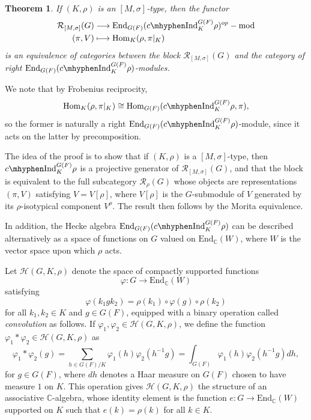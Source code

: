 \documentclass{article}
\newcommand{\Hom}{\mathrm{Hom}}
\newcommand{\End}{\mathrm{End}}
\newcommand{\cR}{\mathcal{R}}
\newcommand{\cH}{\mathcal{H}}
\newcommand{\CC}{\mathbb{C}}
\newcommand{\cInd}{c\mhyphen\mathrm{Ind}}
\theoremstyle{plain}
\newtheorem{theorem}{Theorem}[section]
\theoremstyle{definition}
\begin{document}
    \begin{theorem}
        If $(K,\rho)$ is an $[M,\sigma]$-type, then the functor 
        \begin{align*}
            \cR_{[M,\sigma]}(G)&\longrightarrow \End_{G(F)}(\cInd_K^{G(F)}\rho)^{op}-\textrm{mod}\\
            (\pi,V)&\longmapsto\Hom_K(\rho,\pi|_K)
        \end{align*}
        is an equivalence of categories between the block $\cR_{[M,\sigma]}(G)$ and the category of right $\End_{G(F)}(\cInd_K^{G(F)}\rho)$-modules. 
    \end{theorem}
    We note that by Frobenius reciprocity, $$\Hom_K(\rho,\pi|_K)\cong\Hom_{G(F)}(\cInd_K^{G(F)}\rho,\pi),$$ so the former is naturally a right $\End_{G(F)}(\cInd_K^{G(F)}\rho)$-module, since it acts on the latter by precomposition.

    The idea of the proof is to show that if $(K,\rho)$ is a $[M,\sigma]$-type, then $\cInd_K^{G(F)}\rho$ is a projective generator of 
    $\cR_{[M,\sigma]}(G)$, and that the block is equivalent to the full subcategory $\cR_\rho(G)$ whose objects are representations $(\pi,V)$ satisfying $V=V[\rho]$, where $V[\rho]$ is the $G$-submodule of $V$ generated by its $\rho$-isotypical component $V^\rho$. The result then follows by the Morita equivalence. 

    In addition, the Hecke algebra $\End_{G(F)}(\cInd_K^{G(F)}\rho)$ can be described alternatively as a space of functions on $G$ valued on $\End_\CC(W)$, where $W$ is the vector space upon which $\rho$ acts.

    Let $\cH(G,K,\rho)$ denote the space of compactly supported functions $$\varphi:G\longrightarrow\End_\CC(W)$$
    satisfying
    $$\varphi(k_1 g k_2)=\rho(k_1)\circ\varphi(g)\circ\rho(k_2)$$
    for all $k_1,k_2\in K$ and $g\in G(F)$, equipped with a binary operation called \textit{convolution} as follows. If $\varphi_1,\varphi_2\in\cH(G,K,\rho)$, we define the function $\varphi_1*\varphi_2\in\cH(G,K,\rho)$ as
    $$\varphi_1*\varphi_2(g)=\sum_{h\in G(F)/K}\varphi_1(h)\varphi_2(h^{-1}g)=\int_{G(F)}\varphi_1(h)\varphi_2(h^{-1}g)dh,$$
    for $g\in G(F)$, where $dh$ denotes a Haar measure on $G(F)$ chosen to have measure $1$ on $K$. This operation gives $\cH(G,K,\rho)$ the structure of an associative $\CC$-algebra, whose identity element is the function $e:G\to\End_\CC(W)$ supported on $K$ such that $e(k)=\rho(k)$ for all $k\in K$.
\end{document}
